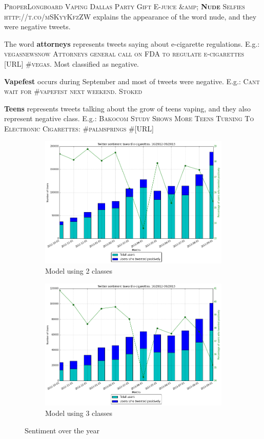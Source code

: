 \documentclass{sig-alternate}
\begin{document}
\textsc{ProperLongboard Vaping Dallas Party Gift E-juice \&amp; \textbf{Nude} Selfies http://t.co/mSKyyKfzZW} explains the appearance of the word nude, and they were negative tweets.

The word \textbf{attorneys} represents tweets saying about e-cigarette regulations. E.g.: \textsc{vegasnewsnow Attorneys general call on FDA to regulate e-cigarettes [URL] \#vegas}. Most classified as negative.

\textbf{Vapefest} occurs during September and most of tweets were negative. E.g.: \textsc{Cant wait for \#vapefest next weekend. Stoked}

\textbf{Teens} represents tweets talking about the grow of teens vaping, and they also represent negative class. E.g.: \textsc{Bakocom Study Shows More Teens Turning To Electronic Cigarettes: \#palmsprings \#[URL]}\\

\begin{figure}[t]
\begin{subfigure}{\columnwidth}
  \includegraphics[width=\columnwidth]{sentiment1correct.png}
  \caption{Model using 2 classes}
  \label{figura:sent}
\end{subfigure}%
\begin{subfigure}{\columnwidth}
  \includegraphics[width=\columnwidth]{sentiment2correct.png}
  \caption{Model using 3 classes}
  \label{figura:sent2}
\end{subfigure}%
\caption{Sentiment over the year}
\end{figure}
\end{document}
